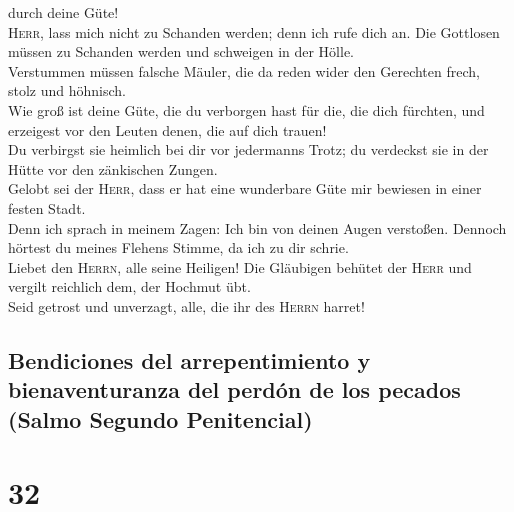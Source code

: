 durch deine Güte!\\
 \textsc{Herr}, lass mich nicht zu Schanden werden; denn
ich rufe dich an. Die Gottlosen müssen zu Schanden werden und schweigen
in der Hölle.\\
 Verstummen müssen falsche Mäuler, die da reden wider den
Gerechten frech, stolz und höhnisch.\\
 Wie groß ist deine Güte, die du verborgen hast für die,
die dich fürchten, und erzeigest vor den Leuten denen, die auf dich
trauen!\\
 Du verbirgst sie heimlich bei dir vor jedermanns Trotz;
du verdeckst sie in der Hütte vor den zänkischen Zungen.\\
 Gelobt sei der \textsc{Herr}, dass er hat eine
wunderbare Güte mir bewiesen in einer festen Stadt.\\
 Denn ich sprach in meinem Zagen: Ich bin von deinen
Augen verstoßen. Dennoch hörtest du meines Flehens Stimme, da ich zu dir
schrie.\\
 Liebet den \textsc{Herrn}, alle seine Heiligen! Die
Gläubigen behütet der \textsc{Herr} und vergilt reichlich dem, der
Hochmut übt.\\
 Seid getrost und unverzagt, alle, die ihr des
\textsc{Herrn} harret!

\hypertarget{bendiciones-del-arrepentimiento-y-bienaventuranza-del-perduxf3n-de-los-pecados-salmo-segundo-penitencial}{%
\subsection{Bendiciones del arrepentimiento y bienaventuranza del perdón
de los pecados (Salmo Segundo
Penitencial)}\label{bendiciones-del-arrepentimiento-y-bienaventuranza-del-perduxf3n-de-los-pecados-salmo-segundo-penitencial}}

\hypertarget{section-31}{%
\section{32}\label{section-31}}

